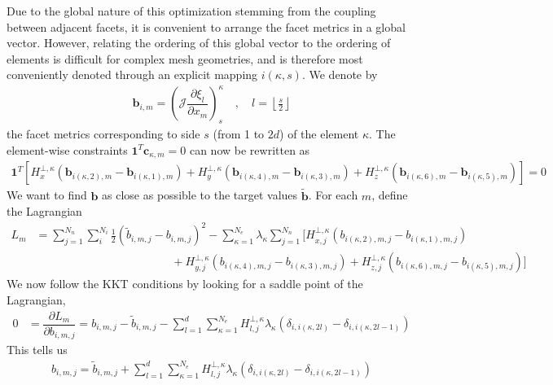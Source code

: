 \documentclass[12pt,a4paper]{article}
\newcommand{\pder}[2][]{\dfrac{\partial #1}{\partial #2}} %
\newcommand{\fn}[1]{\mathcal{#1}} %
\begin{document}
Due to the global nature of this optimization stemming from the coupling between adjacent facets, it is convenient to arrange the facet metrics in a global vector. However, relating the ordering of this global vector to the ordering of elements is difficult for complex mesh geometries, and is therefore most conveniently denoted through an explicit mapping $i(\kappa, s)$. We denote by
\begin{align*}
\bm{b}_{i,m} =  \left( \fn{J} \pder[\xi_l]{x_m} \right)_s^\kappa \quad , \quad l = \left\lfloor \frac{s}{2} \right\rfloor
\end{align*}
the facet metrics corresponding to side $s$ (from 1 to $2d$) of the element $\kappa$. The element-wise constraints $\bm{1}^T \bm{c}_{\kappa , m} = 0$ can now be rewritten as
\begin{align*}
\bm{1}^T \left[ H^{\bot,\kappa}_{x} \left( \bm{b}_{i(\kappa,2),m} - \bm{b}_{i(\kappa,1),m} \right) + H^{\bot,\kappa}_{y} \left( \bm{b}_{i(\kappa,4),m} - \bm{b}_{i(\kappa,3),m} \right) + H^{\bot,\kappa}_{z} \left( \bm{b}_{i(\kappa,6),m} - \bm{b}_{i(\kappa,5),m} \right) \right] = 0
\end{align*}
We want to find $\bm{b}$ as close as possible to the target values $\tilde{\bm{b}}$. For each $m$, define the Lagrangian
\begin{align*}
L_m &= \sum_{j=1}^{N_n} \sum_{i}^{N_i} \frac{1}{2} \left( \tilde{b}_{i,m,j} - b_{i,m,j} \right)^2 -  \sum_{\kappa=1}^{N_e} \lambda_{\kappa} \sum_{j=1}^{N_n} \Big[ H^{\bot,\kappa}_{x,j} \left( b_{i(\kappa,2),m,j} - b_{i(\kappa,1),m,j} \right)  \\
&\hspace{5cm} + H^{\bot,\kappa}_{y,j} \left( b_{i(\kappa,4),m,j} - b_{i(\kappa,3),m,j} \right) + H^{\bot,\kappa}_{z,j} \left( b_{i(\kappa,6),m,j} - b_{i(\kappa,5),m,j} \right) \Big]
\end{align*}
We now follow the KKT conditions by looking for a saddle point of the Lagrangian,
\begin{align*}
0 &= \pder[L_m]{b_{i,m,j}} = b_{i,m,j}  -  \tilde{b}_{i,m,j}  - \sum_{l=1}^d \sum_{\kappa=1}^{N_e} H^{\bot,\kappa}_{l,j} \lambda_{\kappa} \left(  \delta_{i,i(\kappa,2l)}  -  \delta_{i,i(\kappa,2l-1)}  \right)
\end{align*}
This tells us
\begin{align*}
b_{i,m,j}  =  \tilde{b}_{i,m,j}  + \sum_{l=1}^d \sum_{\kappa=1}^{N_e}  H^{\bot,\kappa}_{l,j} \lambda_{\kappa} \left( \delta_{i,i(\kappa,2l)}  - \delta_{i,i(\kappa,2l-1)}  \right)
\end{align*}
\end{document}
